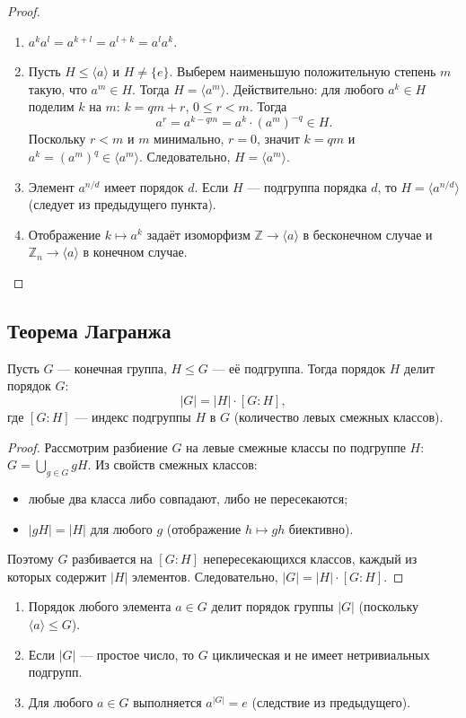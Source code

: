 \documentclass[10pt]{article}
\begin{document}
\begin{proof}
\begin{enumerate}
    \item $a^k a^l = a^{k+l} = a^{l+k} = a^l a^k$.
    \item Пусть $H \le \langle a \rangle$ и $H \neq \{e\}$. Выберем наименьшую положительную степень $m$ такую, что $a^m \in H$. Тогда $H = \langle a^m \rangle$. Действительно: для любого $a^k \in H$ поделим $k$ на $m$: $k = qm + r$, $0 \le r < m$. Тогда
\[
a^r = a^{k - qm} = a^k \cdot (a^m)^{-q} \in H.
\]
Поскольку $r < m$ и $m$ минимально, $r = 0$, значит $k = qm$ и $a^k = (a^m)^q \in \langle a^m \rangle$. Следовательно, $H = \langle a^m \rangle$.
    \item Элемент $a^{n/d}$ имеет порядок $d$. Если $H$ — подгруппа порядка $d$, то $H = \langle a^{n/d} \rangle$ (следует из предыдущего пункта).
    \item Отображение $k \mapsto a^k$ задаёт изоморфизм $\mathbb{Z} \to \langle a \rangle$ в бесконечном случае и $\mathbb{Z}_n \to \langle a \rangle$ в конечном случае.
\end{enumerate}
\end{proof}

\subsection{Теорема Лагранжа}

\begin{theorem}[Лагранж]
Пусть $G$ — конечная группа, $H \le G$ — её подгруппа. Тогда порядок $H$ делит порядок $G$:
\[
|G| = |H| \cdot [G:H],
\]
где $[G:H]$ — индекс подгруппы $H$ в $G$ (количество левых смежных классов).
\end{theorem}

\begin{proof}
Рассмотрим разбиение $G$ на левые смежные классы по подгруппе $H$: $G = \bigcup_{g \in G} gH$. Из свойств смежных классов:
\begin{itemize}
    \item любые два класса либо совпадают, либо не пересекаются;
    \item $|gH| = |H|$ для любого $g$ (отображение $h \mapsto gh$ биективно).
\end{itemize}
Поэтому $G$ разбивается на $[G:H]$ непересекающихся классов, каждый из которых содержит $|H|$ элементов. Следовательно, $|G| = |H| \cdot [G:H]$.
\end{proof}

\begin{corollary}
\begin{enumerate}
    \item Порядок любого элемента $a \in G$ делит порядок группы $|G|$ (поскольку $\langle a \rangle \le G$).
    \item Если $|G|$ — простое число, то $G$ циклическая и не имеет нетривиальных подгрупп.
    \item Для любого $a \in G$ выполняется $a^{|G|} = e$ (следствие из предыдущего).
\end{enumerate}
\end{corollary}
\end{document}
